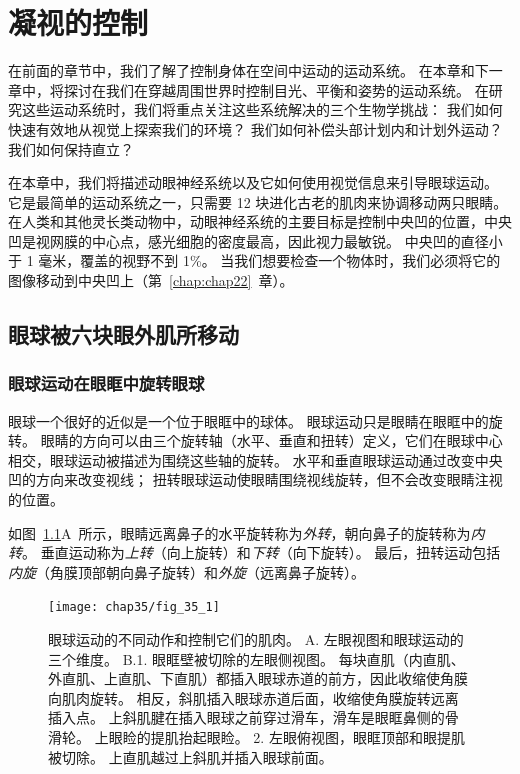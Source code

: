 \chapter{凝视的控制} \label{chap:chap35}

在前面的章节中，我们了解了控制身体在空间中运动的运动系统。
在本章和下一章中，将探讨在我们在穿越周围世界时控制目光、平衡和姿势的运动系统。
在研究这些运动系统时，我们将重点关注这些系统解决的三个生物学挑战：
我们如何快速有效地从视觉上探索我们的环境？
我们如何补偿头部计划内和计划外运动？
我们如何保持直立？


在本章中，我们将描述动眼神经系统以及它如何使用视觉信息来引导眼球运动。
它是最简单的运动系统之一，只需要 12 块进化古老的肌肉来协调移动两只眼睛。
在人类和其他灵长类动物中，动眼神经系统的主要目标是控制中央凹的位置，中央凹是视网膜的中心点，感光细胞的密度最高，因此视力最敏锐。
中央凹的直径小于 1 毫米，覆盖的视野不到 1\%。
当我们想要检查一个物体时，我们必须将它的图像移动到中央凹上（第~\ref{chap:chap22}~章）。



\section{眼球被六块眼外肌所移动}

\subsection{眼球运动在眼眶中旋转眼球}

眼球一个很好的近似是一个位于眼眶中的球体。
眼球运动只是眼睛在眼眶中的旋转。
眼睛的方向可以由三个旋转轴（水平、垂直和扭转）定义，它们在眼球中心相交，眼球运动被描述为围绕这些轴的旋转。
水平和垂直眼球运动通过改变中央凹的方向来改变视线；
扭转眼球运动使眼睛围绕视线旋转，但不会改变眼睛注视的位置。


如图~\ref{fig:35_1}A~所示，眼睛远离鼻子的水平旋转称为\textit{外转}，朝向鼻子的旋转称为\textit{内转}。 
垂直运动称为\textit{上转}（向上旋转）和\textit{下转}（向下旋转）。
最后，扭转运动包括\textit{内旋}（角膜顶部朝向鼻子旋转）和\textit{外旋}（远离鼻子旋转）。


\begin{figure}[htbp]
	\centering
	\texttt{[image: chap35/fig\_35\_1]}
	\caption{眼球运动的不同动作和控制它们的肌肉。
		A. 左眼视图和眼球运动的三个维度。
		B.1. 眼眶壁被切除的左眼侧视图。
		每块直肌（内直肌、外直肌、上直肌、下直肌）都插入眼球赤道的前方，因此收缩使角膜向肌肉旋转。
		相反，斜肌插入眼球赤道后面，收缩使角膜旋转远离插入点。
		上斜肌腱在插入眼球之前穿过滑车，滑车是眼眶鼻侧的骨滑轮。
		上眼睑的提肌抬起眼睑。
		2. 左眼俯视图，眼眶顶部和眼提肌被切除。 
		上直肌越过上斜肌并插入眼球前面。}
	\label{fig:35_1}
\end{figure}



